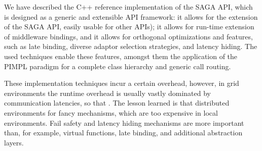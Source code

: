 
We have described the C++ reference implementation of the SAGA API,
which is designed as a generic and extensible API framework:  it
allows for the extension of the SAGA API,
easily usable for other APIs); 
it allows for run-time extension of
middleware bindings, 
and it allows for orthogonal optimizations and features,
such as late binding, diverse adaptor selection strategies, and latency
hiding.  The used techniques enable
these features, amongst them the application of the PIMPL paradigm for
a complete class hierarchy and generic call routing.

These implementation techniques incur a certain overhead, however, in
grid environments the runtime overhead is usually vastly dominated by
communication latencies, so that .  The lesson learned is that distributed environments
 for fancy mechanisms, which are too expensive in local
environments.  Fail safety and latency hiding mechanisms are
more important than, for example, virtual functions, late
binding, and additional abstraction layers.  
